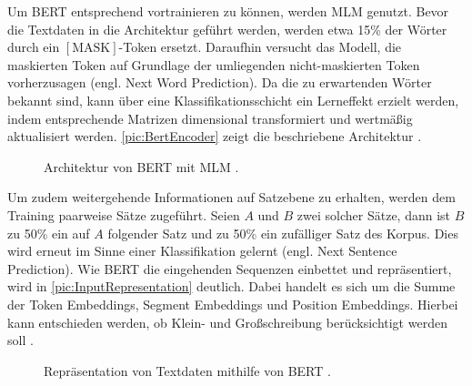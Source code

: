 \noindent
Um \ac{BERT} entsprechend vortrainieren zu können, werden \ac{MLM} genutzt. Bevor die Textdaten in die Architektur geführt werden, werden etwa 15\% der Wörter durch ein $[\text{MASK}]$-Token ersetzt. Daraufhin versucht das Modell, die maskierten Token auf Grundlage der umliegenden nicht-maskierten Token vorherzusagen (engl. Next Word Prediction). Da die zu erwartenden Wörter bekannt sind, kann über eine Klassifikationsschicht ein Lerneffekt erzielt werden, indem entsprechende Matrizen dimensional transformiert und wertmäßig aktualisiert werden. \autoref{pic:BertEncoder} zeigt die beschriebene Architektur \cite[S.~4-5]{DEV19}.

\begin{figure}[h!]
  \centering
  \caption{Architektur von \ac{BERT} mit \ac{MLM} \cite[S.~3]{DEV19}.}
  \label{pic:BertEncoder}
\end{figure}

\noindent
Um zudem weitergehende Informationen auf Satzebene zu erhalten, werden dem Training paarweise Sätze zugeführt. Seien $A$ und $B$ zwei solcher Sätze, dann ist $B$ zu 50\% ein auf $A$ folgender Satz und zu 50\% ein zufälliger Satz des Korpus. Dies wird erneut im Sinne einer Klassifikation gelernt (engl. Next Sentence Prediction). Wie \ac{BERT} die eingehenden Sequenzen einbettet und repräsentiert, wird in \autoref{pic:InputRepresentation} deutlich. Dabei handelt es sich um die Summe der Token Embeddings, Segment Embeddings und Position Embeddings. Hierbei kann entschieden werden, ob Klein- und Großschreibung berücksichtigt werden soll \cite[S.~3-5]{DEV19}.
\newpage

\begin{figure}[h!]
  \centering
  \caption{Repräsentation von Textdaten mithilfe von BERT \cite[S.~3]{DEV19}.}
  \label{pic:InputRepresentation}
\end{figure}

